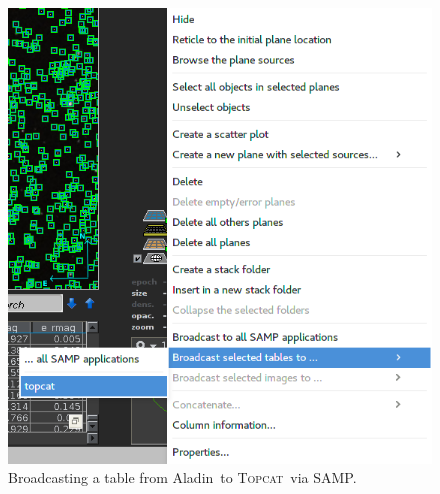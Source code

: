 \documentclass [a4paper, 12pt]{article}
\newcommand{\aladin}{{\textsc{A}{ladin}}}
\newcommand{\topcat}{{\textsc{Topcat}}}
\begin{document}
\begin{itemize}
\begin{figure}[H]
        \includegraphics[width=0.75 
        \textwidth]{../images/aladin_send_table_topcat.png}
        \caption{Broadcasting a table from \aladin\ to \topcat\ via SAMP. }
        \label{fig:broadcast_aladin_topcat}
    \end{figure}
\end{itemize}
\end{document}
